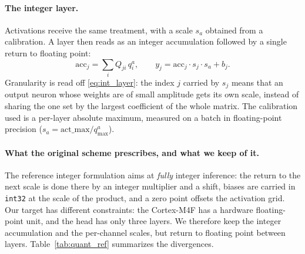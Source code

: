 \paragraph{The integer layer.} Activations receive the same treatment, with a scale $s_a$ obtained from
a calibration. A layer then reads as an integer accumulation followed by a single return to floating
point:
\begin{equation}
\label{eq:int_layer}
\mathrm{acc}_j = \sum_i Q_{ji} \, q^a_i ,
\qquad
y_j = \mathrm{acc}_j \cdot s_j \cdot s_a + b_j .
\end{equation}
Granularity is read off \eqref{eq:int_layer}: the index $j$ carried by $s_j$ means that an output neuron
whose weights are of small amplitude gets its own scale, instead of sharing the one set by the largest
coefficient of the whole matrix. The calibration used is a per-layer absolute maximum, measured on a
batch in floating-point precision ($s_a = \mathrm{act\_max}/q^a_{\max}$).

\paragraph{What the original scheme prescribes, and what we keep of it.} The reference integer
formulation \cite{Jacob2018,Krishnamoorthi2018} aims at \emph{fully} integer inference: the return to
the next scale is done there by an integer multiplier and a shift, biases are carried in \texttt{int32}
at the scale of the product, and a zero point offsets the activation grid. Our target has different
constraints: the Cortex-M4F has a hardware floating-point unit, and the head has only three layers. We
therefore keep the integer accumulation and the per-channel scales, but return to floating point
between layers. Table~\ref{tab:quant_ref} summarizes the divergences.

